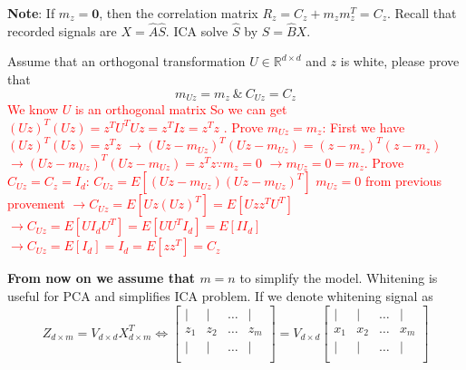 \documentclass[a4 paper]{article}
\begin{document}
\textbf{Note}: If $m_z=\textbf{0}$, then the correlation matrix $R_z=C_z+m_zm_z^T=C_z$.
Recall that recorded signals are $X=\hat{A}\hat{S}$. ICA solve $\hat{S}$ by $\hat{S}=\hat{B}X$.
\begin{tcolorbox}[colback=RubineRed!5!white,colframe=RubineRed!75!black]
Assume that an orthogonal transformation $U\in\mathbb{R}^{d\times d}$ and $z$ is white, please prove that
\begin{equation}
    m_{Uz}=m_z \ \& \ C_{Uz}=C_z
\end{equation}
\newline
\textcolor{red}{We know $U$ is an orthogonal matrix\newline
So we can get $(Uz)^T(Uz)=z^TU^TUz=z^TIz=z^Tz$ . Prove $m_{Uz}=m_z$:\newline
\hspace*{0.5cm} First we have $(Uz)^T(Uz)=z^Tz$\newline
\hspace*{0.5cm} $\rightarrow(Uz-m_{Uz})^T(Uz-m_{Uz})=(z-m_z)^T(z-m_z)$ \newline
\hspace*{0.5cm} $\rightarrow(Uz-m_{Uz})^T(Uz-m_{Uz})=z^Tz$\hspace*{0.5cm}$\because m_z=0$\newline
\hspace*{0.5cm} $\rightarrow m_{Uz}=0=m_z$. Prove $C_{Uz}=C_z=I_d$:\newline
\hspace*{0.5cm} $C_{Uz}=E[(Uz-m_{Uz})(Uz-m_{Uz})^T]$\newline
\hspace*{0.5cm} $m_{Uz}=0$ from previous provement $\rightarrow C_{Uz}=E[Uz(Uz)^T]=E[Uzz^TU^T]$ \newline
\hspace*{0.5cm} $\rightarrow C_{Uz}=E[UI_dU^T]=E[UU^TI_d]=E[II_d]$\newline
\hspace*{0.5cm} $\rightarrow C_{Uz}=E[I_d]=I_d=E[zz^T]=C_z$
}
\end{tcolorbox}
\textbf{From now on we assume that $m=n$} to simplify the model. Whitening is useful for PCA and simplifies ICA problem.
If we denote whitening signal as 
\begin{equation}
Z_{d\times m}=V_{d\times d}X^T_{d\times m}\iff
\begin{bmatrix}
| & | &  \hdots & | \\
z_1 & z_2 & \hdots & z_m \\
| & | & \hdots & | \\
\end{bmatrix}=V_{d\times d}
\begin{bmatrix}
| & | & \hdots & |\\
x_1 & x_2 & \hdots & x_m\\
| & | & \hdots & |\\
\end{bmatrix}
\end{equation}
\end{document}
